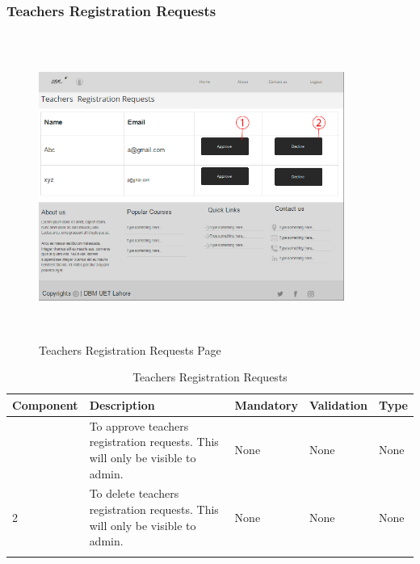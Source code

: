 \documentclass[12pt]{article}
\begin{document}
\newpage
\subsubsection{Teachers Registration Requests}
\begin{figure}[h]
  \centering
  \includegraphics[width=10cm, height=10cm]{TeachersRegistrationRequests}
  \caption{Teachers Registration Requests Page}
\end{figure}

\begin{longtable}{|>{\raggedright\arraybackslash}p{2.5cm}|>{\raggedright\arraybackslash}p{2.5cm}|>{\raggedright\arraybackslash}p{2.5cm}|>{\raggedright\arraybackslash}p{2cm}|>{\raggedright\arraybackslash}p{2cm}|}
\hline
\textbf{Component} & \textbf{Description} & \textbf{Mandatory} & \textbf{Validation} & \textbf{Type}\\
\hline
1 &
To approve teachers registration requests. This will only be visible to admin. &
None &
None &
None\\
\hline

2 &
To delete teachers registration requests. This will only be visible to admin. &
None &
None &
None \\
\hline

\caption{Teachers Registration Requests}
\end{longtable}
\end{document}
